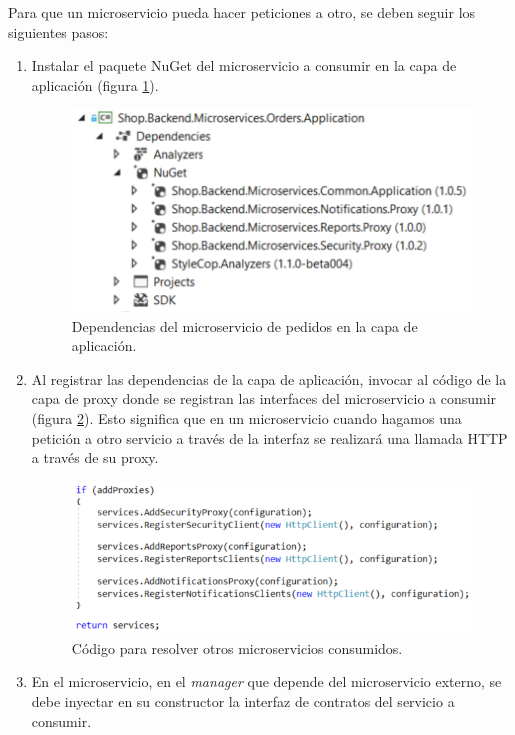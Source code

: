 \documentclass[11pt,spanish,listoffigures]{tfgetsinf}
\begin{document}
Para que un microservicio pueda hacer peticiones a otro, se deben seguir los siguientes pasos:

\begin{enumerate}

\item Instalar el paquete NuGet del microservicio a consumir en la capa de aplicación (figura \ref{fig:OrdersApplicationDependencies}).

\begin{figure}[h]
\centering
\includegraphics[scale=0.85]{OrdersApplicationDependencies}
\caption{Dependencias del microservicio de pedidos en la capa de aplicación.}
\label{fig:OrdersApplicationDependencies}
\end{figure}

\item Al registrar las dependencias de la capa de aplicación, invocar al código de la capa de proxy donde se registran las interfaces del microservicio a consumir (figura \ref{fig:UsingMicroservices}). Esto significa que en un microservicio cuando hagamos una petición a otro servicio a través de la interfaz se realizará una llamada HTTP a través de su proxy.

\begin{figure}[h]
\centering
\includegraphics[scale=0.85]{UsingMicroservices}
\caption{Código para resolver otros microservicios consumidos.}
\label{fig:UsingMicroservices}
\end{figure}

\item En el microservicio, en el \textit{manager} que depende del microservicio externo, se debe inyectar en su constructor la interfaz de contratos del servicio a consumir.

\end{enumerate}
\end{document}
